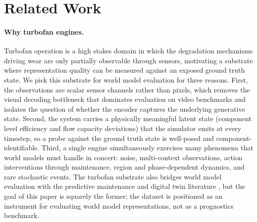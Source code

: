 \documentclass{article}
\begin{document}
\section{Related Work}
\label{sec:related_work}

\paragraph{Why turbofan engines.}
Turbofan operation is a high stakes domain in which the degradation mechanisms driving wear are only partially observable through sensors, motivating a substrate where representation quality can be measured against an exposed ground truth state. We pick this substrate for world model evaluation for three reasons. First, the observations are scalar sensor channels rather than pixels, which removes the visual decoding bottleneck that dominates evaluation on video benchmarks and isolates the question of whether the encoder captures the underlying generative state. Second, the system carries a physically meaningful latent state (component level efficiency and flow capacity deviations) \cite{lacaille2014robust, karchmer1977identification} that the simulator emits at every timestep, so a probe against the ground truth state is well-posed and component-identifiable. Third, a single engine simultaneously exercises many phenomena \cite{riegler2007geared, dunn1987performance, thoma2020quantifying, aygun2024thermodynamics} that world models must handle in concert: noise, multi-context observations, action interventions through maintenance, region and phase-dependent dynamics, and rare stochastic events. The turbofan substrate also bridges world model evaluation with the predictive maintenance \cite{zonta2020predictive, lee2014prognostics, tsui2015prognostics, jaw2005recent} and digital twin literature \cite{mihai2022digital, Belfadel_Creff_Ben_Hamida_2025}, but the goal of this paper is squarely the former; the dataset is positioned as an instrument for evaluating world model representations, not as a prognostics benchmark.
\end{document}
